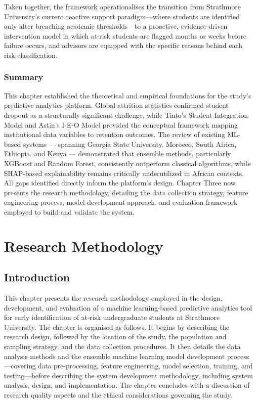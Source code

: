 \documentclass[12pt]{report}
\begin{document}
Taken together, the framework operationalises the transition from
Strathmore University's current reactive support paradigm---where
students are identified only after breaching academic thresholds---to
a proactive, evidence-driven intervention model in which at-risk
students are flagged months or weeks before failure occurs, and advisors are
equipped with the specific reasons behind each risk classification.

\subsection*{Summary}
This chapter established the theoretical and empirical foundations for the
study's predictive analytics platform. Global attrition statistics confirmed
student dropout as a structurally significant challenge, while Tinto's Student
Integration Model and Astin's I-E-O Model provided the conceptual framework mapping
institutional data variables to retention outcomes. The review of existing ML-based
systems --- spanning Georgia State University, Morocco, South Africa, Ethiopia, and
Kenya --- demonstrated that ensemble methods, particularly XGBoost and Random Forest,
consistently outperform classical algorithms, while SHAP-based explainability remains
critically underutilized in African contexts. All gaps identified directly inform the platform's design.
Chapter Three now presents the research methodology, detailing the data collection strategy,
feature engineering process, model development approach, and evaluation framework employed
to build and validate the system.


\chapter{Research Methodology}

\section{Introduction}

This chapter presents the research methodology employed in the design, development,
and evaluation of a machine learning-based predictive analytics tool for early
identification of at-risk undergraduate students at Strathmore University. The chapter
is organised as follows. It begins by describing the research design, followed by the
location of the study, the population and sampling strategy, and the data collection
procedures. It then details the data analysis methods and the ensemble machine
learning model development process---covering data pre-processing, feature
engineering, model selection, training, and testing---before describing the system
development methodology, including system analysis, design, and implementation.
The chapter concludes with a discussion of research quality aspects and the ethical
considerations governing the study.
\end{document}
